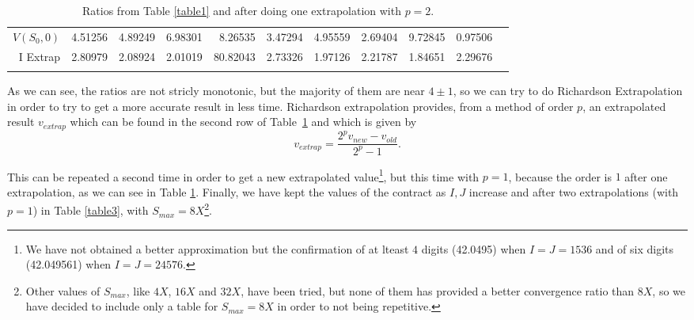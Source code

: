 \begin{table}[h]\scriptsize
	\setlength{\tabcolsep}{8pt}
	\renewcommand{\arraystretch}{1.3}
	\begin{tabular}{r|rrrrrrrrrr}
		\hline\addlinespace[0.1cm]
		$V(S_0,0)$ & 4.51256 & 4.89249 & 6.98301 &  8.26535 & 3.47294 & 4.95559 & 2.69404 & 9.72845 & 0.97506 & \\
		I Extrap & 2.80979 & 2.08924 & 2.01019 & 80.82043 & 2.73326 & 1.97126 & 2.21787 & 1.84651 & 2.29676 &          \\\addlinespace[0.1cm]
		\hline
	\end{tabular}
	\vspace{0.2cm}
	\captionsetup{width=.55\linewidth}
	\caption{Ratios from Table \ref{table1} and after doing one extrapolation with $p=2$.}\label{table2}
\end{table}
\vspace{-1cm}
As we can see, the ratios are not stricly monotonic, but the majority of them are near $4\pm1$, so we can try to do Richardson Extrapolation in order to try to get a more accurate result in less time. Richardson extrapolation provides, from a method of order $p$, an extrapolated result $v_{extrap}$ which can be found in the second row of Table~\ref{table2} and which is given by
\begin{equation}
	v_{extrap} = \frac{2^p v_{new} - v_{old} }{2^p - 1}.
\end{equation}

This can be repeated a second time in order to get a new extrapolated value\footnote{We have not obtained a better approximation but the confirmation of at lteast $4$ digits (42.0495) when $I=J=1536$ and of six digits (42.049561) when $I=J=24576$.}, but this time with $p=1$, because the order is $1$ after one extrapolation, as we can see in Table \ref{table2}. Finally, we have kept the values of the contract as $I, J$ increase and after two extrapolations (with $p=1$) in Table \ref{table3}, with $S_{max} = 8X$\footnote{Other values of $S_{max}$, like $4X$, $16X$ and $32X$, have been tried, but none of them has provided a better convergence ratio than $8X$, so we have decided to include only a table for $S_{max}=8X$ in order to not being repetitive.}.

